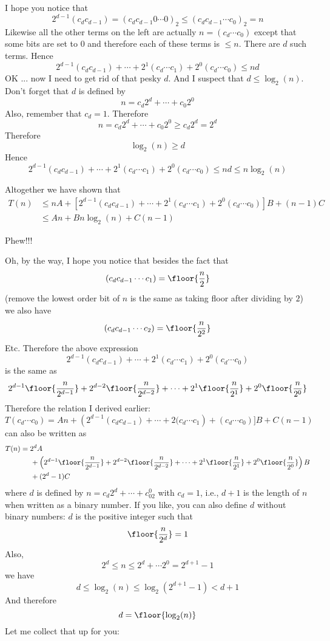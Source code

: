 I hope you notice that
\[
2^{d-1}(c_d c_{d-1}) 
= (c_d c_{d-1} 0 \cdots 0)_2 
\leq (c_dc_{d-1} \cdots c_0)_2 
= n
\]
Likewise all the other terms on the left are actually $n = (c_d \cdots c_0)$ 
except that 
some bits are set to 0 and therefore each of these terms is $\leq n$.
There are $d$ such terms.
Hence 
\[
2^{d-1}(c_d c_{d-1}) + \cdots + 2^1(c_d \cdots c_1) + 2^0(c_d \cdots c_0) 
\leq nd
\]
OK ... now I need to get rid of that pesky $d$.
And I suspect that $d \leq \log_2(n)$.
Don't forget that $d$ is defined by 
\[
n = c_d 2^d + \cdots + c_0 2^0
\]
Also, remember that $c_d = 1$.
Therefore
\[
n = c_d 2^d + \cdots + c_0 2^0 \geq c_d 2^d = 2^d
\]
Therefore
\[
\log_2 (n) \geq d
\]
Hence
\[
2^{d-1}(c_d c_{d-1}) + \cdots + 2^1(c_d \cdots c_1) + 2^0(c_d \cdots c_0) 
\leq nd \leq n \log_2(n)
\]

Altogether we have shown that
\begin{align*}
T(n) 
&\leq nA 
   + [2^{d-1}(c_d c_{d-1}) + \cdots 
   + 2^1(c_d \cdots c_1) + 2^0(c_d \cdots c_0)]B 
   + (n - 1)C \\
&\leq An 
   + Bn \log_2(n) 
   + C(n - 1)
\end{align*}

Phew!!!

Oh, by the way, I hope you notice that besides the fact that
\[
(c_d c_{d-1} \cdots c_1) = \floor{\frac{n}{2}}
\]
(remove the lowest order bit of $n$ is the same as taking
floor after dividing by $2$)
we also have
\[
(c_d c_{d-1}\cdots c_2) = \floor{\frac{n}{2^2}}
\]
Etc.
Therefore the above expression
\[
2^{d-1}(c_d c_{d-1}) + \cdots + 2^1(c_d \cdots c_1) + 2^0(c_d \cdots c_0)
\]
is the same as 
\[
2^{d-1}\floor{ \frac{n}{2^{d-1}} } 
+ 2^{d-2}\floor{ \frac{n}{2^{d-2}} } 
+ \cdots
+ 2^1\floor{ \frac{n}{2^1} } 
+ 2^0\floor{ \frac{n}{2^0} } 
\]
Therefore the relation I derived earlier:
\[
T(c_d \cdots c_0) 
= An 
   + \left(
     2^{d-1}(c_d c_{d-1}) + \cdots + 2(c_d \cdots c_1
     \right) 
   + (c_d \cdots c_0)]B 
   + C(n-1) 
\]
can also be written as
\begin{align*}
T(n) 
&= 2^dA \\
&\hspace{0.5cm}
+ \left(
2^{d-1}\floor{ \frac{n}{2^{d-1}} } 
+ 2^{d-2}\floor{ \frac{n}{2^{d-2}} } 
+ \cdots
+ 2^1\floor{ \frac{n}{2^1} } 
+ 2^0\floor{ \frac{n}{2^0} } 
\right)B \\ 
&\hspace{0.5cm}+ (2^d - 1)C 
\end{align*}
where $d$ is defined by $n = c_d 2^d + \cdots + c_02^0$ with $c_d = 1$, i.e.,
$d + 1$ is the length of $n$ when written as a binary number.
If you like, you can also define $d$ without binary numbers:
$d$ is the positive integer such that 
\[
\floor{
\frac{n}{2^d}
} = 1
\]
Also,
\[
2^d \leq n \leq 2^d + \cdots 2^0 = 2^{d+1} - 1
\]
we have
\[
d \leq \log_2(n) \leq \log_2(2^{d+1} - 1) < d+1
\]
And therefore
\[
d = \floor{\log_2(n)} 
\]
Let me collect that up for you:

